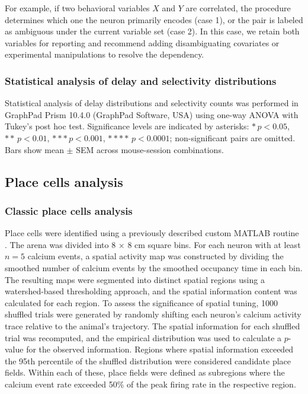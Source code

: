 For example, if two behavioral variables $X$ and $Y$ are correlated, the procedure
determines which one the neuron primarily encodes (case 1), or the pair is labeled as ambiguous under the current variable set (case 2). In this case, we retain both variables for reporting and recommend adding disambiguating covariates or experimental manipulations to resolve the dependency. 

\subsubsection{Statistical analysis of delay and selectivity distributions}
\label{sec:statistical_analysis_delays}

Statistical analysis of delay distributions and selectivity counts was
performed in GraphPad Prism 10.4.0 (GraphPad Software, USA) using
one-way ANOVA with Tukey's post hoc test.
Significance levels are indicated by asterisks:
$*$\,$p<0.05$, $**$\,$p<0.01$, $***$\,$p<0.001$, $****$\,$p<0.0001$;
non-significant pairs are omitted.
Bars show mean $\pm$ SEM across mouse-session combinations.

\subsection{Place cells analysis}
\label{sec:place_cells_analysis}

\subsubsection{Classic place cells analysis}
\label{sec:classic_pc_identification}
Place cells were identified using a previously described custom MATLAB routine
\cite{Plusnin2021}. The arena was divided into 8 × 8 cm square bins. For each neuron
with at least $n=5$ calcium events, a spatial activity map was constructed by
dividing the smoothed number of calcium events by the smoothed occupancy time in
each bin. The resulting maps were segmented into distinct spatial regions using a
watershed-based thresholding approach, and the spatial information content was
calculated for each region.
To assess the significance of spatial tuning, 1000 shuffled trials were generated by
randomly shifting each neuron's calcium activity trace relative to the animal's
trajectory. The spatial information for each shuffled trial was recomputed, and the
empirical distribution was used to calculate a $p$-value for the observed
information. Regions where spatial information exceeded the 95th percentile of the
shuffled distribution were considered candidate place fields. Within each of these,
place fields were defined as subregions where the calcium event rate exceeded 50\%
of the peak firing rate in the respective region.


